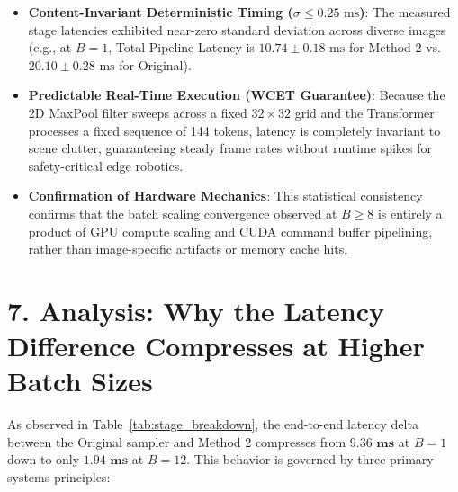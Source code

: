 \documentclass[11pt,a4paper]{article}
\begin{document}
\begin{tcolorbox}[colback=white,colframe=cardborder,arc=2mm,boxrule=0.8pt]
\begin{itemize}[leftmargin=*,itemsep=3pt]
    \item \textbf{Content-Invariant Deterministic Timing ($\sigma \le 0.25\text{ ms}$)}: The measured stage latencies exhibited near-zero standard deviation across diverse images (e.g., at $B=1$, Total Pipeline Latency is $10.74 \pm 0.18\text{ ms}$ for Method 2 vs. $20.10 \pm 0.28\text{ ms}$ for Original).
    \item \textbf{Predictable Real-Time Execution (WCET Guarantee)}: Because the 2D MaxPool filter sweeps across a fixed $32\times 32$ grid and the Transformer processes a fixed sequence of 144 tokens, latency is completely invariant to scene clutter, guaranteeing steady frame rates without runtime spikes for safety-critical edge robotics.
    \item \textbf{Confirmation of Hardware Mechanics}: This statistical consistency confirms that the batch scaling convergence observed at $B \ge 8$ is entirely a product of GPU compute scaling and CUDA command buffer pipelining, rather than image-specific artifacts or memory cache hits.
\end{itemize}
\end{tcolorbox}

\vspace{0.4em}

\section*{7. Analysis: Why the Latency Difference Compresses at Higher Batch Sizes}

As observed in Table~\ref{tab:stage_breakdown}, the end-to-end latency delta between the Original sampler and Method 2 compresses from $\mathbf{9.36\text{ ms}}$ at $B=1$ down to only $\mathbf{1.94\text{ ms}}$ at $B=12$. This behavior is governed by three primary systems principles:
\end{document}
